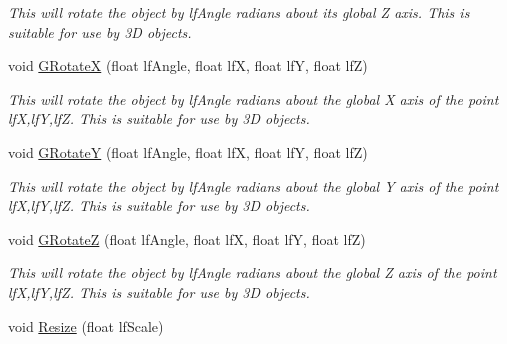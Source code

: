 \begin{DoxyCompactItemize}
\begin{DoxyCompactList}\small\item\em This will rotate the object by lfAngle radians about its global Z axis. This is suitable for use by 3D objects. \end{DoxyCompactList}\item 
\hypertarget{classc_camera_matrix4_a2fc16f6a7aa3ffec1317f71645aa857b}{
void \hyperlink{classc_camera_matrix4_a2fc16f6a7aa3ffec1317f71645aa857b}{GRotateX} (float lfAngle, float lfX, float lfY, float lfZ)}
\label{classc_camera_matrix4_a2fc16f6a7aa3ffec1317f71645aa857b}

\begin{DoxyCompactList}\small\item\em This will rotate the object by lfAngle radians about the global X axis of the point lfX,lfY,lfZ. This is suitable for use by 3D objects. \end{DoxyCompactList}\item 
\hypertarget{classc_camera_matrix4_a775326e51bf492340e8768d219a4e5e2}{
void \hyperlink{classc_camera_matrix4_a775326e51bf492340e8768d219a4e5e2}{GRotateY} (float lfAngle, float lfX, float lfY, float lfZ)}
\label{classc_camera_matrix4_a775326e51bf492340e8768d219a4e5e2}

\begin{DoxyCompactList}\small\item\em This will rotate the object by lfAngle radians about the global Y axis of the point lfX,lfY,lfZ. This is suitable for use by 3D objects. \end{DoxyCompactList}\item 
\hypertarget{classc_camera_matrix4_a8c99ce20f8594e9a66e0a7b2830ec9e9}{
void \hyperlink{classc_camera_matrix4_a8c99ce20f8594e9a66e0a7b2830ec9e9}{GRotateZ} (float lfAngle, float lfX, float lfY, float lfZ)}
\label{classc_camera_matrix4_a8c99ce20f8594e9a66e0a7b2830ec9e9}

\begin{DoxyCompactList}\small\item\em This will rotate the object by lfAngle radians about the global Z axis of the point lfX,lfY,lfZ. This is suitable for use by 3D objects. \end{DoxyCompactList}\item 
\hypertarget{classc_camera_matrix4_a620ba52edfd711f011d43a441eece9bc}{
void \hyperlink{classc_camera_matrix4_a620ba52edfd711f011d43a441eece9bc}{Resize} (float lfScale)}
\label{classc_camera_matrix4_a620ba52edfd711f011d43a441eece9bc}


\end{DoxyCompactItemize}
